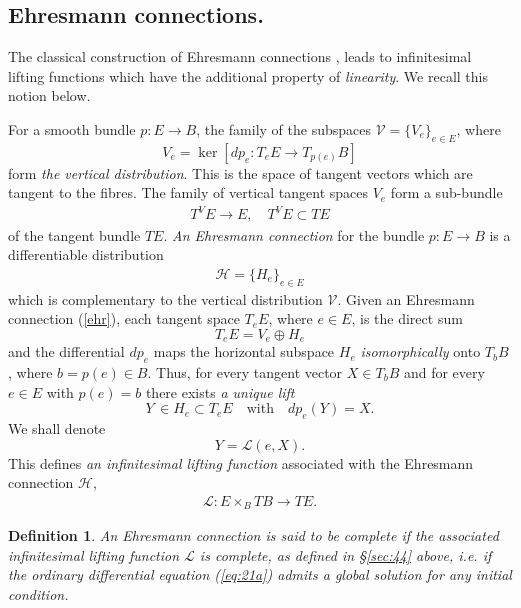\documentclass[11pt]{amsart}
\newtheorem{definition}[theorem]{Definition}
\begin{document}
{%

\subsection{Ehresmann connections.}\label{sec:ehresmann} The classical construction of Ehresmann connections  \cite{E}, \cite{W} leads to infinitesimal lifting functions which have the additional property of {\it linearity}. We recall this notion below. 

For a smooth bundle $p: E\to B$, 
the family of the subspaces $\mathcal V=\{V_e\}_{e\in E}$, where
$$V_e=\ker[dp_e: T_eE\to  T_{p(e)}B]$$
form {\it the vertical distribution}. This is the space of tangent vectors which are tangent to the fibres. The family of vertical tangent spaces $V_e$ 
form a sub-bundle 
\begin{eqnarray}\label{eq:vert}
T^VE\to E, \quad T^VE\subset TE
\end{eqnarray}
of the tangent bundle $TE$.
{\it An Ehresmann connection} for the bundle $p:E\to B$ is a differentiable distribution 
\begin{eqnarray}\label{ehr}
\mathcal H=\{H_e\}_{e\in E}\end{eqnarray}
which is complementary to the vertical distribution $\mathcal V$.
Given an Ehresmann connection (\ref{ehr}), each tangent space $T_eE$, where $e\in E$, is the direct sum $$T_eE=V_e\oplus H_e$$ and the differential 
$dp_e$ maps the horizontal subspace $H_e$ {\it isomorphically} onto $T_{b}B$, where $b=p(e)\in B$. Thus, for every tangent vector $X\in T_bB$ and for every $e\in E$ with $p(e)=b$ there exists {\it a unique lift} 
$$Y \, \in H_e\subset T_eE \quad\mbox{with}\quad  dp_e(Y)=X.$$
We shall denote 
$$
Y = \mathcal L(e, X).
$$
This defines  {\it an infinitesimal lifting function} associated with the Ehresmann connection $\mathcal H$, 
\begin{eqnarray}\label{ilfe}
\mathcal L: E\times_B TB\to TE.
\end{eqnarray} 

 \begin{definition}
 An Ehresmann connection is said to be complete if the associated infinitesimal lifting function $\mathcal L$ is complete, as defined in \S \ref{sec:44} above, i.e. if the ordinary differential equation (\ref{eq:21a}) admits a global solution for any initial condition. 
 \end{definition}
% 

}
\end{document}
